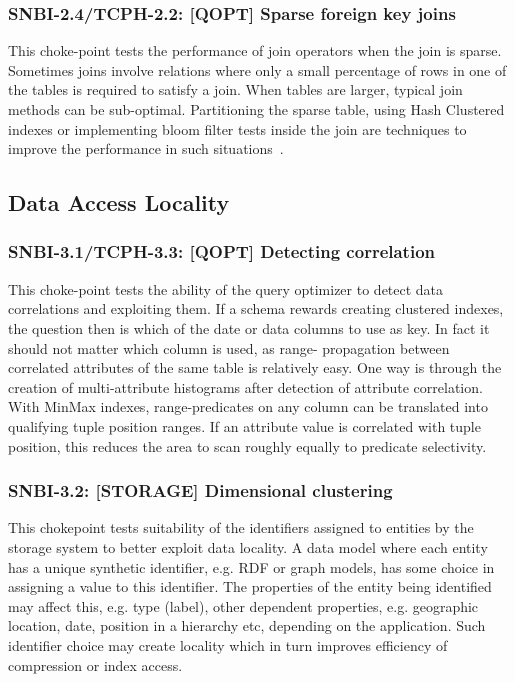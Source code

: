 \subsubsection{SNBI-2.4/TCPH-2.2: [QOPT]  Sparse foreign key joins}
\label{choke_point_2.4}
This choke-point tests the performance of join operators when the join is sparse. Sometimes joins involve relations where only a small percentage of rows in one of the tables is required to satisfy a join. When tables are larger, typical join methods can be sub-optimal. Partitioning the sparse table, using Hash Clustered indexes or implementing bloom filter tests inside the join are techniques to improve the performance in such situations~\cite{DBLP:journals/csur/Graefe93}.


\subsection{Data Access Locality}

\subsubsection{SNBI-3.1/TCPH-3.3: [QOPT]  Detecting correlation}
\label{choke_point_3.1}
This choke-point tests the ability of the query optimizer to detect data correlations and exploiting them. If a schema rewards creating clustered indexes, the question then is which of the date or data columns to use as key.
In fact it should not matter which column is used, as range- propagation between correlated attributes of the same table is relatively easy. One way is through the creation of multi-attribute histograms after detection of attribute correlation.
With MinMax indexes, range-predicates on any column can be translated into qualifying tuple position ranges. If an attribute value is correlated with tuple position, this reduces the area to scan roughly equally to predicate selectivity.

\subsubsection{SNBI-3.2: [STORAGE] Dimensional clustering}
\label{choke_point_3.2}
This chokepoint tests suitability of the identifiers assigned to entities by the storage system to better exploit data locality. A data model where each entity has a unique synthetic identifier,
e.g. RDF or graph models, has some choice in assigning a value to this identifier. The properties of the entity being identified may affect this, e.g. type (label), other dependent properties,
e.g. geographic location, date, position in a hierarchy etc, depending on the application. Such identifier choice may create locality which in turn improves efficiency of compression or index access.

